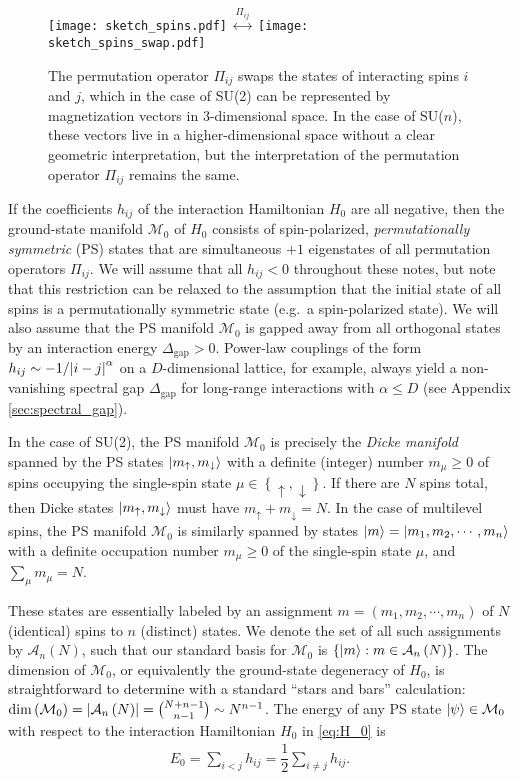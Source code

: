 \documentclass[nofootinbib,notitlepage,11pt]{revtex4-2}
\renewcommand{\t}{\text} %
\newcommand{\f}[2]{\dfrac{#1}{#2}} %
\newcommand{\p}[1]{\left(#1\right)} %
\renewcommand{\set}[1]{\left\{#1\right\}} %
\newcommand{\1}{\mathds{1}}
\newcommand{\up}{\uparrow}
\newcommand{\dn}{\downarrow}
\newcommand{\A}{\mathcal{A}}
\newcommand{\M}{\mathcal{M}}
\begin{document}
\begin{figure}
  \centering \texttt{[image: sketch\_spins.pdf]} $\stackrel{\displaystyle\Pi_{ij}} {\displaystyle\longleftrightarrow}$ \texttt{[image: sketch\_spins\_swap.pdf]}
  \caption{The permutation operator $\Pi_{ij}$ swaps the states of interacting spins $i$ and $j$, which in the case of SU(2) can be represented by magnetization vectors in 3-dimensional space.
    In the case of SU($n$), these vectors live in a higher-dimensional space without a clear geometric interpretation, but the interpretation of the permutation operator $\Pi_{ij}$ remains the same.
  }
\label{fig:sketch_spins}
\end{figure}

If the coefficients $h_{ij}$ of the interaction Hamiltonian $H_0$ are all negative, then the ground-state manifold $\M_0$ of $H_0$ consists of spin-polarized, {\it permutationally symmetric} (PS) states that are simultaneous $+1$ eigenstates of all permutation operators $\Pi_{ij}$.
We will assume that all $h_{ij}<0$ throughout these notes, but note that this restriction can be relaxed to the assumption that the initial state of all spins is a permutationally symmetric state (e.g.~a spin-polarized state).
We will also assume that the PS manifold $\M_0$ is gapped away from all orthogonal states by an interaction energy $\Delta_{\t{gap}}>0$.
Power-law couplings of the form $h_{ij}\sim-1/\abs{i-j}^\alpha$ on a $D$-dimensional lattice, for example, always yield a non-vanishing spectral gap $\Delta_{\t{gap}}$ for long-range interactions with $\alpha\le D$ (see Appendix \ref{sec:spectral_gap}).

In the case of SU(2), the PS manifold $\M_0$ is precisely the {\it Dicke manifold} spanned by the PS states $\ket{m_\up,m_\dn}$ with a definite (integer) number $m_\mu\ge0$ of spins occupying the single-spin state $\mu\in\set{\up,\dn}$.
If there are $N$ spins total, then Dicke states $\ket{m_\up,m_\dn}$ must have $m_\up+m_\dn=N$.
In the case of multilevel spins, the PS manifold $\M_0$ is similarly spanned by states $\ket{m}=\ket{m_1,m_2,\cdots,m_n}$ with a definite occupation number $m_\mu\ge0$ of the single-spin state $\mu$, and $\sum_\mu m_\mu=N$.

These states are essentially labeled by an assignment $m=\p{m_1,m_2,\cdots,m_n}$ of $N$ (identical) spins to $n$ (distinct) states.
We denote the set of all such assignments by $\A_n\p{N}$, such that our standard basis for $\M_0$ is $\set{\ket{m}:m\in\A_n\p{N}}$.
The dimension of $\M_0$, or equivalently the ground-state degeneracy of $H_0$, is straightforward to determine with a standard ``stars and bars'' calculation: $\dim\p{\M_0}=\abs{\A_n\p{N}} = {N+n-1 \choose n-1} \sim N^{n-1}$.
The energy of any PS state $\ket\psi\in\M_0$ with respect to the interaction Hamiltonian $H_0$ in \eqref{eq:H_0} is
\begin{align}
  E_0 = \sum_{i<j} h_{ij} = \f12 \sum_{i\ne j} h_{ij}.
\end{align}
\end{document}
